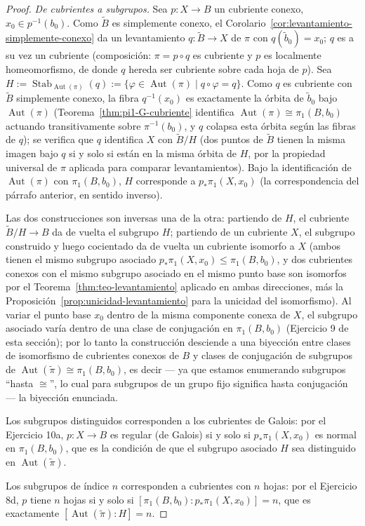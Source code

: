 \documentclass[11pt,a4paper]{article}
\theoremstyle{plain}
\theoremstyle{definition}
\theoremstyle{remark}
\DeclareMathOperator{\Stab}{Stab}
\DeclareMathOperator{\Aut}{Aut}
\begin{document}
\begin{proof}
\emph{De cubrientes a subgrupos.} Sea $p:X\to B$ un cubriente conexo,
$x_0\in p^{-1}(b_0)$. Como $\tilde B$ es simplemente conexo, el
Corolario~\ref{cor:levantamiento-simplemente-conexo} da un levantamiento
$q:\tilde B\to X$ de $\pi$ con $q(\tilde b_0)=x_0$; $q$ es a su vez un
cubriente (composición: $\pi=p\circ q$ es cubriente y $p$ es localmente
homeomorfismo, de donde $q$ hereda ser cubriente sobre cada hoja de $p$).
Sea $H:=\Stab_{\Aut(\pi)}(q)\!:=\{\varphi\in\Aut(\pi)\mid q\circ\varphi=q\}$.
Como $q$ es cubriente con $\tilde B$ simplemente conexo, la fibra
$q^{-1}(x_0)$ es exactamente la órbita de $\tilde b_0$ bajo $\Aut(\pi)$
(Teorema~\ref{thm:pi1-G-cubriente} identifica $\Aut(\pi)\cong\pi_1(B,b_0)$
actuando transitivamente sobre $\pi^{-1}(b_0)$, y $q$ colapsa esta órbita
según las fibras de $q$); se verifica que $q$ identifica $X$ con
$\tilde B/H$ (dos puntos de $\tilde B$ tienen la misma imagen bajo $q$ si y
solo si están en la misma órbita de $H$, por la propiedad universal de
$\pi$ aplicada para comparar levantamientos). Bajo la identificación de
$\Aut(\pi)$ con $\pi_1(B,b_0)$, $H$ corresponde a $p_*\pi_1(X,x_0)$ (la
correspondencia del párrafo anterior, en sentido inverso).

Las dos construcciones son inversas una de la otra: partiendo de $H$, el
cubriente $\tilde B/H\to B$ da de vuelta el subgrupo $H$; partiendo de un
cubriente $X$, el subgrupo construido y luego cocientado da de vuelta un
cubriente isomorfo a $X$ (ambos tienen el mismo subgrupo asociado
$p_*\pi_1(X,x_0)\le\pi_1(B,b_0)$, y dos cubrientes conexos con el mismo
subgrupo asociado en el mismo punto base son isomorfos por el
Teorema~\ref{thm:teo-levantamiento} aplicado en ambas direcciones, más la
Proposición~\ref{prop:unicidad-levantamiento} para la unicidad del
isomorfismo). Al variar el punto base $x_0$ dentro de la misma componente
conexa de $X$, el subgrupo asociado varía dentro de una clase de
conjugación en $\pi_1(B,b_0)$ (Ejercicio 9 de esta sección); por lo tanto
la construcción desciende a una biyección entre clases de isomorfismo de
cubrientes conexos de $B$ y clases de conjugación de subgrupos de
$\Aut(\tilde\pi)\cong\pi_1(B,b_0)$, es decir --- ya que estamos
enumerando subgrupos ``hasta $\cong$'', lo cual para subgrupos de un grupo
fijo significa hasta conjugación --- la biyección enunciada.

Los subgrupos distinguidos corresponden a los cubrientes de Galois: por
el Ejercicio 10a, $p:X\to B$ es regular (de Galois) si y solo si
$p_*\pi_1(X,x_0)$ es normal en $\pi_1(B,b_0)$, que es la condición de que
el subgrupo asociado $H$ sea distinguido en $\Aut(\tilde\pi)$.

Los subgrupos de índice $n$ corresponden a cubrientes con $n$ hojas: por
el Ejercicio 8d, $p$ tiene $n$ hojas si y solo si
$[\pi_1(B,b_0):p_*\pi_1(X,x_0)]=n$, que es exactamente
$[\Aut(\tilde\pi):H]=n$.
\end{proof}
\end{document}
